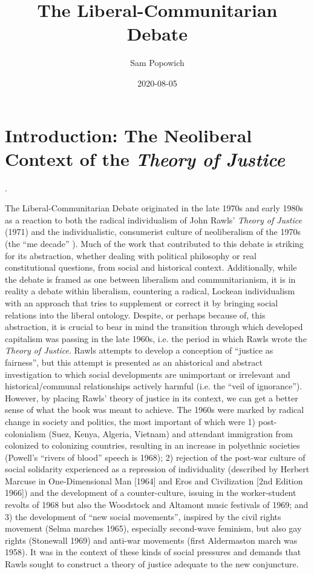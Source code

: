 \documentclass[12pt,oneside]{memoir}
\title{The Liberal-Communitarian Debate}
\author{Sam Popowich}
\date{2020-08-05}
\begin{document}
\maketitle
\clearpage

\newpage
\setcounter{page}{1}

\mainmatter


\section*{Introduction: The Neoliberal Context of the \emph{Theory of Justice}}.

The Liberal-Communitarian Debate originated in the late 1970s and early 1980s as a reaction to both the radical individualism of John Rawls' \textit{Theory of Justice }(1971) and the individualistic, consumerist culture of neoliberalism of the 1970s (the ``me decade'' \citep{Wolfe1976}). Much of the work that contributed to this debate is striking for its abstraction, whether dealing with political philosophy or real constitutional questions, from social and historical context. Additionally, while the debate is framed as one between liberalism and communitarianism, it is in reality a debate within liberalism, countering a radical, Lockean individualism with an approach that tries to supplement or correct it by bringing social relations into the liberal ontology.
Despite, or perhaps because of, this abstraction, it is crucial to bear in mind the transition through which developed capitalism was passing in the late 1960s, i.e. the period in which Rawls wrote the \textit{Theory of Justice}. Rawls attempts to develop a conception of ``justice as fairness'', but this attempt is presented as an ahistorical and abstract investigation to which social developments are unimportant or irrelevant and historical/communal relationships actively harmful (i.e. the ``veil of ignorance''). However, by placing Rawls' theory of justice in its context, we can get a better sense of what the book was meant to achieve.
The 1960s were marked by radical change in society and politics, the most important of which were 1) post-colonialism (Suez, Kenya, Algeria, Vietnam) and attendant immigration from colonized to colonizing countries, resulting in an increase in polyethnic societies (Powell's ``rivers of blood'' speech is 1968); 2) rejection of the post-war culture of social solidarity experienced as a repression of individuality (described by Herbert Marcuse in One-Dimensional Man [1964] and  Eros and Civilization [2nd Edition 1966]) and the development of a counter-culture, issuing in the worker-student revolts of 1968 but also the Woodstock and Altamont music festivals of 1969; and 3) the development of ``new social movements'', inspired by the civil rights movement (Selma marches 1965), especially second-wave feminism, but also gay rights (Stonewall 1969) and anti-war movements (first Aldermaston march was 1958). It was in the context of these kinds of social pressures and demands that Rawls sought to construct a theory of justice adequate to the new conjuncture.
\end{document}
